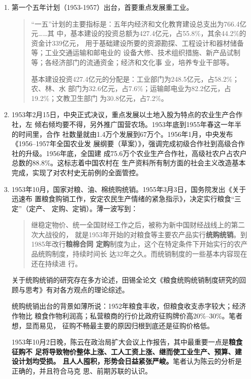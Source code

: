 \begin{enumerate}
\item 第一个五年计划（1953-1957）出台，首要重点发展重工业。
  \begin{quotation}
    “一五”计划的主要指标是：五年内经济和文化教育建设总支出为766.4亿元……其
    中，基本建设的投资总额为427.4亿元，占55.8\%，其余44.2\%的资金计339亿元，
    用于基础建设所要的资源勘探、工程设计和器材储备等；工业交通运输和邮电业的
    设备大修、技术组织措施、新产品试制等；各经济部门的流通资金；经济和文化事
    业，培养专业干部等。

    基本建设投资427.4亿元的分配是：工业部门为248.5亿元，占58.2\%；农、林、水
    部门为32.6亿元，占7.6\%；运输邮电业为82.2亿元，占19.2\%；文教卫生部门
    为30.8亿元，占7.2\%。
  \end{quotation}

\item 1953年2月15日，中央正式决议，重点发展以土地入股为特点的农业生产合作社，左
  倾右倾均要不得，另外推广国营农场。1953年底到1955年春这一年半的时间里，合作
  社数量就由1.4万个发展到67万个。1956年1月，中央发布《1956--1957年全国农业发
  展纲要（草案）》，强调完成初级合作社到高级合作社的升级。1956年底，全国建
  成75.6万个农业生产合作社，高级社农户占农户总数的88.8\%。这标志着中国农村在
  生产资料所有制方面的社会主义改造基本完成，实现了对农村史无前例的全面管控。

\item 1953年10月，国家对粮、油、棉统购统销。1955年3月3日，国务院发出《关于迅速布
  置粮食购销工作，安定农民生产情绪的紧急指示》，决定实行粮食“三定”（定产、
  定购、定销）。薄一波写到：
  \begin{quotation}
    继稳定物价、统一全国财经工作之后，被称为新中国财经战线上的第二次大战役的，
    就是1953年开始的对粮食等主要农产品实行\textbf{统购统销}。到1985年改行\textbf{粮棉合同
      定购}制度为止，这个在特定条件下开始实行的农产品统购制度，持续时间长
    达32年之久。而统销制度的一些基本内容现在还在持续进
    行。\cite[255]{boyibo}
  \end{quotation}

  关于统购统销的研究存在多方论述，田锡全论文《粮食统购统销制度研究的回
  顾与思考》有对各方观点的理论综述。

  统购统销出台的背景如薄所说：1952年粮食丰收，但粮食收支赤字较大；经济作物比
  粮食作物利润高；私营粮商的行价比政府征购牌价高20\%--30\%。笔者想，显而易见，
  征购不畅最主要的原因归根到底还是征购价格低。

  1953年10月2日晚，陈云在政治局扩大会议上作报告，其中最重要一点是\textbf{粮食征购不
    足将导致物价整体上涨、工人工资上涨、继而使工业生产、预算、建设计划均受损。
    且人人囤积，形势会日益紧张严峻。}笔者认为陈云的分析是正确的，并且符合马克
  思、前期苏联的认识。


\end{enumerate}
